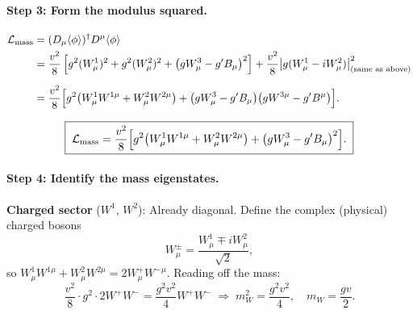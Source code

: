 \documentclass[12pt,a4paper]{article}
\newcommand{\Lag}{\mathcal{L}}
\begin{document}
\paragraph{Step 3: Form the modulus squared.}
\begin{align}
  \Lag_{\mathrm{mass}}
  &= (D_\mu\langle\phi\rangle)^\dagger D^\mu\langle\phi\rangle \notag\\
  &= \frac{v^2}{8}\left[
       g^2(W^1_\mu)^2 + g^2(W^2_\mu)^2
     + \bigl(gW^3_\mu - g'B_\mu\bigr)^2
     \right]
     + \frac{v^2}{8}\bigl|g(W^1_\mu - iW^2_\mu)\bigr|^2_{\text{(same as above)}} \notag\\[6pt]
  &= \frac{v^2}{8}\Bigl[
       g^2\bigl(W^1_\mu W^{1\mu} + W^2_\mu W^{2\mu}\bigr)
     + \bigl(gW^3_\mu - g'B_\mu\bigr)\bigl(gW^{3\mu} - g'B^\mu\bigr)
     \Bigr] .
  \label{eq:sg:mass_quadratic}
\end{align}

\begin{equation}
  \boxed{\;
  \Lag_{\mathrm{mass}}
  = \frac{v^2}{8}\Bigl[
       g^2\bigl(W^1_\mu W^{1\mu} + W^2_\mu W^{2\mu}\bigr)
     + \bigl(gW^3_\mu - g'B_\mu\bigr)^2
    \Bigr] .
  \;}
  \label{eq:sg:mass_quad_box}
\end{equation}

\paragraph{Step 4: Identify the mass eigenstates.}

\textbf{Charged sector} ($W^1$, $W^2$): Already diagonal. Define the complex (physical) charged bosons
\begin{equation}
  W^\pm_\mu = \frac{W^1_\mu \mp iW^2_\mu}{\sqrt{2}} ,
  \label{eq:sg:W_charged}
\end{equation}
so $W^1_\mu W^{1\mu} + W^2_\mu W^{2\mu} = 2W^+_\mu W^{-\mu}$. Reading off the mass:
\begin{equation}
  \frac{v^2}{8}\cdot g^2 \cdot 2 W^+W^- = \frac{g^2v^2}{4}W^+W^-
  \;\Longrightarrow\;
  m_W^2 = \frac{g^2v^2}{4},\quad m_W = \frac{gv}{2} .
  \label{eq:sg:mW}
\end{equation}
\end{document}
